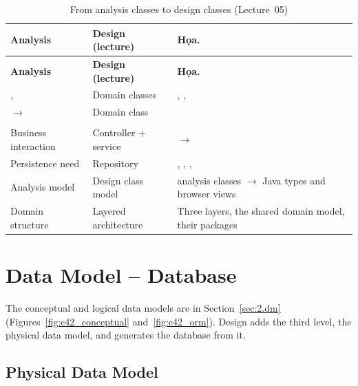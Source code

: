 \begin{longtable}{@{}P{3.6cm}P{4.4cm}P{7.0cm}@{}}
\caption{From analysis classes to design classes (Lecture~05)}\label{tab:a2d}\\
\toprule
\textbf{Analysis} & \textbf{Design (lecture)} & \textbf{Họa.}\\
\midrule
\endfirsthead
\toprule
\textbf{Analysis} & \textbf{Design (lecture)} & \textbf{Họa.}\\
\midrule
\endhead
\small {},  & \small Domain classes & \small {}, , \\
\small {} $\rightarrow$  & \small Domain class & \small {}\\
\small {} & \small {} & \small {}\\
\small Business interaction & \small Controller + service & \small {} $\rightarrow$ \\
\small Persistence need & \small Repository & \small {}, , , \\
\small Analysis model & \small Design class model & \small \nAnalysisClasses{} analysis classes $\rightarrow$ \nJavaTypes{} Java types and \nViews{} browser views\\
\small Domain structure & \small Layered architecture & \small Three layers, the shared domain model, their packages\\
\bottomrule
\end{longtable}

\section{Data Model -- Database}\label{sec:4.2}

The conceptual and logical data models are in Section~\ref{sec:2.dm} (Figures~\ref{fig:c42_conceptual}
and~\ref{fig:c42_orm}). Design adds the third level, the physical data model, and generates the database from it.

\subsection{Physical Data Model}\label{sec:4.2.1}\label{sec:4.2.2}\label{sec:4.2.3}

